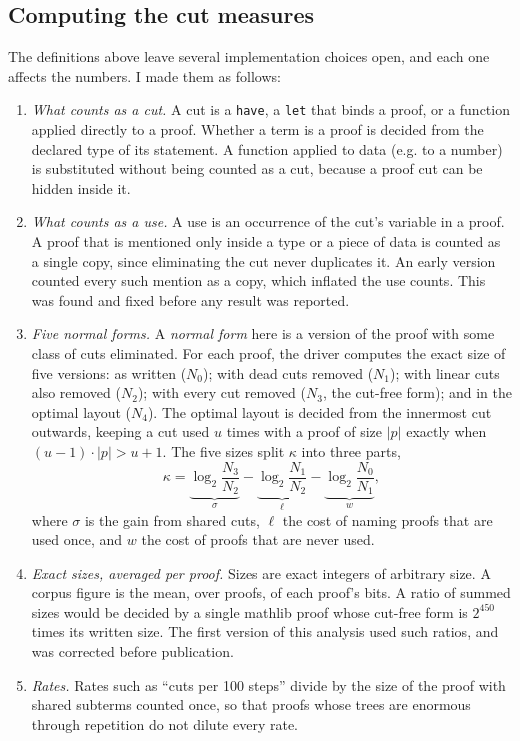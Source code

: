 \documentclass{article}
\begin{document}
\subsection{Computing the cut measures}
The definitions above leave several implementation choices open, and each one affects the numbers. I made them as
follows:
\begin{enumerate}
    \item
    \textit{What counts as a cut.} A cut is a \texttt{have}, a \texttt{let} that binds a proof, or a function applied
    directly to a proof. Whether a term is a proof is decided from the declared type of its statement. A function applied
    to data (e.g. to a number) is substituted without being counted as a cut, because a proof cut can be hidden
    inside it.
    \item
    \textit{What counts as a use.} A use is an occurrence of the cut's variable in a proof. A proof that is mentioned
    only inside a type or a piece of data is counted as a single copy, since eliminating the cut never duplicates
    it. An early version counted every such mention as a copy, which inflated the use counts. This was
    found and fixed before any result was reported.
    \item
    \textit{Five normal forms.} A \textit{normal form} here is a version of the proof with some class of cuts
    eliminated. For each proof, the driver computes the exact size of five versions: as written
    ($N_0$); with dead cuts removed ($N_1$); with linear cuts also removed ($N_2$); with every cut removed ($N_3$, the
    cut-free form); and in the optimal layout ($N_4$). The optimal layout is decided from the innermost cut outwards,
    keeping a cut used $u$ times with a proof of size $|p|$ exactly when $(u-1)\cdot|p|>u+1$. The five sizes split
    $\kappa$ into three parts,
    \[
    \kappa=\underbrace{\log_2\frac{N_3}{N_2}}_{\sigma}
    -\underbrace{\log_2\frac{N_1}{N_2}}_{\ell}
    -\underbrace{\log_2\frac{N_0}{N_1}}_{w},
    \]
    where $\sigma$ is the gain from shared cuts, $\ell$ the cost of naming proofs that are used once, and $w$ the cost
    of proofs that are never used.
    \item
    \textit{Exact sizes, averaged per proof.} Sizes are exact integers of arbitrary size. A corpus figure is the mean,
    over proofs, of each proof's bits. A ratio of summed sizes would be decided by a single mathlib proof whose
    cut-free form is $2^{450}$ times its written size. The first version of this analysis used such ratios, and was
    corrected before publication.
    \item
    \textit{Rates.} Rates such as ``cuts per 100 steps'' divide by the size of the proof with shared subterms counted
    once, so that proofs whose trees are enormous through repetition do not dilute every rate.
\end{enumerate}
\end{document}
